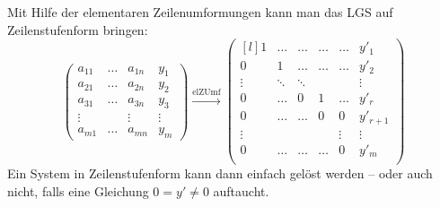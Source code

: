  	\begin{Definition}[Zeilenstufenform]
 		Mit Hilfe der elementaren Zeilenumformungen kann man das LGS auf Zeilenstufenform bringen:
 		\[
 			\begin{pmatrix}
 				a_{11} & \dots & a_{1n} & y_1    \\
 				a_{21} & \dots & a_{2n} & y_2    \\
 				a_{31} & \dots & a_{3n} & y_3    \\
 				\vdots &       & \vdots & \vdots \\
 				a_{m1} & \dots & a_{mn} & y_m
 			\end{pmatrix}
 			\xrightarrow{\text{elZUmf}}
 			\begin{pmatrix*}[l]
 				1 & \dots & \dots &\dots & \dots & y'_1\\
 				0 & 1 & \dots &\dots & \dots & y'_2\\
 				\vdots &\ddots & \ddots & &  &\vdots \\
 				0  & \dots  &  0 & 1 & \dots &y'_r\\
 				0  & \dots  & \dots    & 0 & 0 & y'_{r+1}\\
 				\vdots & & & & \vdots & \vdots \\
 				0 & \dots & \dots   & \dots &  0 & y'_{m}\\
 			\end{pmatrix*}
 		\]
 		Ein System in Zeilenstufenform kann dann einfach gelöst werden -- oder auch nicht, falls eine Gleichung $ 0 = y' \neq 0 $ auftaucht.
 	\end{Definition}
